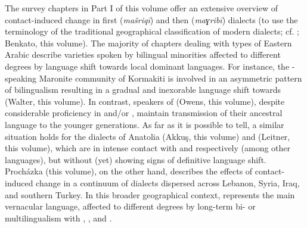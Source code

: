 \documentclass[output=paper]{langsci/langscibook}
\begin{document}
The survey chapters in Part I of this volume offer an extensive overview of contact-induced change in first  (\textit{mašriqī}) and then  (\textit{maɣribī})  dialects (to use the terminology of the traditional geographical classification of modern  dialects; cf. \citealt{Palva2009}; Benkato, this volume). The majority of chapters dealing with types of Eastern Arabic describe varieties spoken by bilingual minorities affected to different degrees by {language shift} towards local dominant languages. For instance, the -speaking Maronite community of {Kormakiti} is involved in an asymmetric pattern of {bilingualism} resulting in a gradual and inexorable {language shift} towards  (Walter, this volume). In contrast, speakers of   (Owens, this volume), despite considerable proficiency in  and/or , maintain {transmission} of their ancestral language to the younger generations. As far as it is possible to tell, a similar situation holds for the  dialects of {Anatolia} (Akkuş, this volume) and  (Leitner, this volume), which are in intense contact with  and  respectively (among other languages), but without (yet) showing signs of definitive {language shift}. Procházka (this volume), on the other hand, describes the effects of contact-induced change in a continuum of   dialects dispersed across Lebanon, Syria, Iraq, and southern Turkey. In this broader geographical context,  represents the main vernacular language, affected to different degrees by long-term bi- or multilingualism with , , and .
\end{document}
